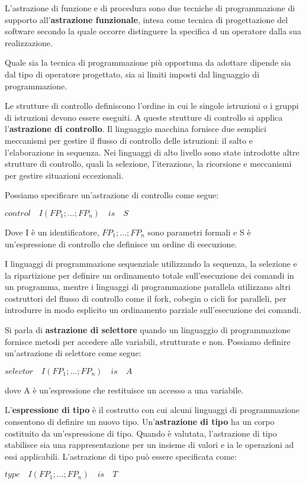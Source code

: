 \documentclass[a4paper,18pt]{extarticle}
\begin{document}
L'astrazione di funzione e di procedura sono due tecniche di programmazione di supporto all'\textbf{astrazione funzionale}, intesa come tecnica di progettazione del software secondo la quale occorre distinguere la specifica d un operatore dalla sua realizzazione.

Quale sia la tecnica di programmazione più opportuna da adottare dipende sia dal tipo di operatore progettato, sia ai limiti imposti dal linguaggio di programmazione.

Le strutture di controllo definiscono l'ordine in cui le singole istruzioni o i gruppi di istruzioni devono essere eseguiti. A queste strutture di controllo si applica l'\textbf{astrazione di controllo}. Il linguaggio macchina fornisce due semplici meccanismi per gestire il flusso di controllo delle istruzioni: il salto e l'elaborazione in sequenza. Nei linguaggi di alto livello sono state introdotte altre strutture di controllo, quali la selezione, l'iterazione, la ricorsione e meccanismi per gestire situazioni eccezionali.

Possiamo specificare un'astrazione di controllo come segue:

\begin{center}
    $control \quad I(FP_1;\dots;FP_n) \quad is\quad S$
\end{center}

Dove I è un identificatore, $FP_1;\dots;FP_n$ sono parametri formali e S è un'espressione di controllo che definisce un ordine di esecuzione.

I linguaggi di programmazione sequenziale utilizzando la sequenza, la selezione e la ripartizione per definire un ordinamento totale sull'esecuzione dei comandi in un programma, mentre i linguaggi di programmazione parallela utilizzano altri costruttori del flusso di controllo come il fork, cobegin o cicli for paralleli, per introdurre in modo esplicito un ordinamento parziale sull'esecuzione dei comandi.

Si parla di \textbf{astrazione di selettore} quando un linguaggio di programmazione fornisce metodi per accedere alle variabili, strutturate e non. Possiamo definire un'astrazione di selettore come segue:

\begin{center}
    $selector \quad I(FP_1;\dots;FP_n) \quad is\quad A$
\end{center}

dove A è un'espressione che restituisce un accesso a una variabile.

L'\textbf{espressione di tipo} è il costrutto con cui alcuni linguaggi di programmazione consentono di definire un nuovo tipo. Un'\textbf{astrazione di tipo} ha un corpo costituito da un'espressione di tipo. Quando è valutata, l'astrazione di tipo stabilisce sia una rappresentazione per un insieme di valori e ia le operazioni ad essi applicabili. L'astrazione di tipo può essere specificata come:
\begin{center}
    $type \quad I(FP_1;\dots;FP_n) \quad is\quad T$
\end{center}
\end{document}
